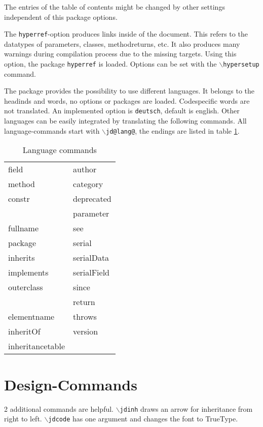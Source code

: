 \documentclass[11pt,a4paper]{article}
\newcommand{\code}[1]{\protect\texttt{#1}}
\newcommand{\befehl}[1]{\code{$\backslash$#1}}
\begin{document}
The entries of the table of contents might be changed by other settings independent of this package options.

The \code{hyperref}-option produces links inside of the document. This refers to the datatypes of parameters, classes, methodreturns, etc. It also produces many warnings during compilation process due to the missing targets. Using this option, the package \code{hyperref} is loaded. Options can be set with the \befehl{hypersetup} command.

The package provides the possibility to use different languages. It belongs to the headinds and words, no options or packages are loaded. Codespecific words are not translated. An implemented option is \code{deutsch}, default is english. Other languages can be easily integrated by translating the following commands. All language-commands start with \befehl{jd@lang@}, the endings are listed in table \ref{tab:jd:lang}.

\begin{table}
	\begin{center}
	\begin{tabular}[h]{l|l}
		 field		  & author \\
		 method		  & category \\
		 constr		  & deprecated \\
		  & parameter \\		 
		 fullname		  & see \\
		 package		  & serial \\
		 inherits		  & serialData \\
		 implements		  & serialField \\
		 outerclass		  & since \\
		  & return \\
		 elementname & throws \\
		 inheritOf & version \\
		 inheritancetable &
		\end{tabular}
		\end{center}
	\label{tab:jd:lang}
	\caption{Language commands}
\end{table}

\section{Design-Commands}
2 additional commands are helpful. \befehl{jdinh} draws an arrow for inheritance from right to left. \befehl{jdcode} has one argument and changes the font to TrueType.
\end{document}
